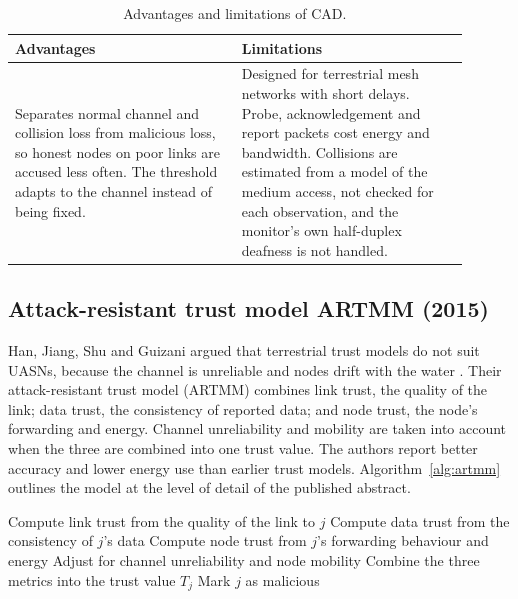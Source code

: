 \documentclass{article}
\begin{document}
\begin{table}[htbp]
\centering\footnotesize\renewcommand{\arraystretch}{1.1}
\begin{tabular}{|p{0.45\linewidth}|p{0.45\linewidth}|}
\hline
\textbf{Advantages} & \textbf{Limitations} \\
\hline
Separates normal channel and collision loss from malicious loss, so honest nodes on poor links are accused less often. The threshold adapts to the channel instead of being fixed. & Designed for terrestrial mesh networks with short delays. Probe, acknowledgement and report packets cost energy and bandwidth. Collisions are estimated from a model of the medium access, not checked for each observation, and the monitor's own half-duplex deafness is not handled. \\
\hline
\end{tabular}
\caption{Advantages and limitations of CAD.}
\end{table}

\subsection{Attack-resistant trust model ARTMM (2015)}\label{sec:artmm}
\noindent
Han, Jiang, Shu and Guizani argued that terrestrial trust models do not suit UASNs, because the channel is unreliable and nodes drift with the water \cite{han2015}. Their attack-resistant trust model (ARTMM) combines link trust, the quality of the link; data trust, the consistency of reported data; and node trust, the node's forwarding and energy. Channel unreliability and mobility are taken into account when the three are combined into one trust value. The authors report better accuracy and lower energy use than earlier trust models. Algorithm~\ref{alg:artmm} outlines the model at the level of detail of the published abstract.

\begin{algorithm}[htbp]
\small
\caption{Outline of ARTMM for an evaluating node}\label{alg:artmm}
\begin{algorithmic}[1]
  \State Compute link trust from the quality of the link to $j$
  \State Compute data trust from the consistency of $j$'s data
  \State Compute node trust from $j$'s forwarding behaviour and energy
  \State Adjust for channel unreliability and node mobility
  \State Combine the three metrics into the trust value $T_j$
    \State Mark $j$ as malicious
  \EndIf
\EndFor
\end{algorithmic}
\end{algorithm}
\end{document}
